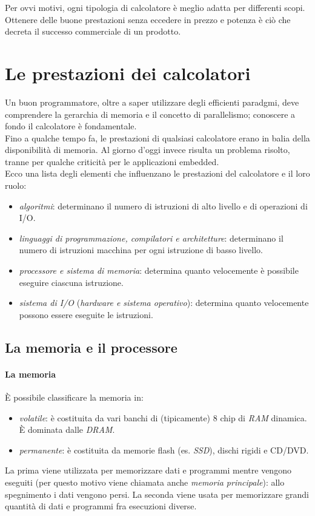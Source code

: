 \documentclass[class=book, crop=false]{standalone}
\begin{document}
Per ovvi motivi, ogni tipologia di calcolatore è meglio adatta per differenti scopi. Ottenere delle buone prestazioni senza eccedere in prezzo e potenza è ciò che decreta il successo commerciale di un prodotto.

\section{Le prestazioni dei calcolatori}
Un buon programmatore, oltre a saper utilizzare degli efficienti paradgmi, deve comprendere la gerarchia di memoria e il concetto di parallelismo; conoscere a fondo il calcolatore è fondamentale.\\
Fino a qualche tempo fa, le prestazioni di qualsiasi calcolatore erano in balia della disponibilità di memoria. Al giorno d'oggi invece risulta un problema risolto, tranne per qualche criticità per le applicazioni embedded.\\
Ecco una lista degli elementi che influenzano le prestazioni del calcolatore e il loro ruolo:
\begin{itemize}[noitemsep]
  \item \emph{algoritmi}: determinano il numero di istruzioni di alto livello e di operazioni di I/O.
  \item \emph{linguaggi di programmazione, compilatori e architetture}: determinano il numero di istruzioni macchina per ogni istruzione di basso livello.
  \item \emph{processore e sistema di memoria}: determina quanto velocemente è possibile eseguire ciascuna istruzione.
  \item \emph{sistema di I/O} (\emph{hardware e sistema operativo}): determina quanto velocemente possono essere eseguite le istruzioni.
\end{itemize}

\subsection{La memoria e il processore}
\paragraph*{La memoria}
\`{E} possibile classificare la memoria in:
\begin{itemize}[noitemsep]
	\item \emph{volatile}: è costituita da vari banchi di (tipicamente) 8 chip di \emph{RAM} dinamica. \`{E} dominata dalle \emph{DRAM}.
	\item \emph{permanente}: è costituita da memorie flash (es. \emph{SSD}), dischi rigidi e CD/DVD.
\end{itemize}
La prima viene utilizzata per memorizzare dati e programmi mentre vengono eseguiti (per questo motivo viene chiamata anche \emph{memoria principale}): allo spegnimento i dati vengono persi. La seconda viene usata per memorizzare grandi quantità di dati e programmi fra esecuzioni diverse.
\end{document}
